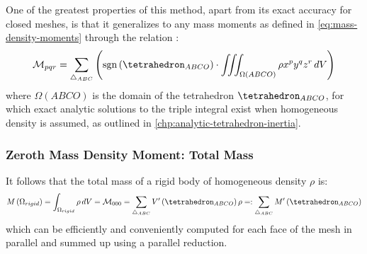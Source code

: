\documentclass[oneside, a4paper]{book}
\newcommand\br[1]{\left(#1\right)}
\DeclareMathOperator{\sgn}{sgn}
\begin{document}
  One of the greatest properties of this method, apart from its exact accuracy for closed meshes, is that it generalizes to any mass moments as defined in \autoref{eq:mass-density-moments} through the relation \autocite{efficient-feature-extraction}:
  \begin{equation}\label{eq:mass-density-moments-using-signed-volume}
    \mathcal{M}_{pqr} = \sum_{\triangle_{ABC}} \br{\sgn\br{\tetrahedron_{ABCO}} \cdot \iiint_{\Omega\br{ABCO}} \rho x^p y^q z^r  \,dV}
  \end{equation}
  where $\Omega\br{ABCO}$ is the domain of the tetrahedron $\tetrahedron_{ABCO}$, for which exact analytic solutions to the triple integral exist when homogeneous density is assumed, as outlined in \autoref{chp:analytic-tetrahedron-inertia}.
  
  
  
  
  \subsubsection{Zeroth Mass Density Moment: Total Mass}
  It follows that the total mass of a rigid body of homogeneous density $\rho$ is:
  \begin{equation}\label{eq:total-rigid-body-mass}
    M\br{\Omega_{rigid}} = \int_{\Omega_{rigid}} \rho \,dV= \mathcal{M}_{000}  = \sum_{\triangle_{ABC}} V'\br{\tetrahedron_{ABCO}} \rho  =:  \sum_{\triangle_{ABC}} M'\br{\tetrahedron_{ABCO}}
  \end{equation}
  which can be efficiently and conveniently computed for each face of the mesh in parallel and summed up using a parallel reduction.
\end{document}
